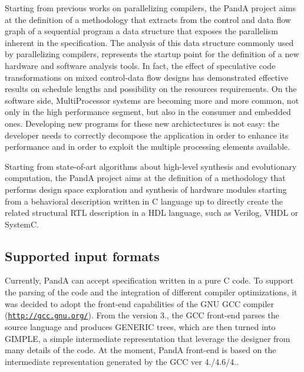 \begin{DoxyItemize}
\item Starting from previous works on parallelizing compilers, the PandA project aims at the definition of a methodology that extracts from the control and data flow graph of a sequential program a data structure that exposes the parallelism inherent in the specification. The analysis of this data structure commonly used by parallelizing compilers, represents the startup point for the definition of a new hardware and software analysis tools. In fact, the effect of speculative code transformations on mixed control-\/data flow designs has demonstrated effective results on schedule lengths and possibility on the resources requirements. On the software side, {\ttfamily Multi\+Processor} systems are becoming more and more common, not only in the high performance segment, but also in the consumer and embedded ones. Developing new programs for these new archictectures is not easy\+: the developer needs to correctly decompose the application in order to enhance its performance and in order to exploit the multiple processing elements available.
\item Starting from state-\/of-\/art algorithms about high-\/level synthesis and evolutionary computation, the PandA project aims at the definition of a methodology that performs design space exploration and synthesis of hardware modules starting from a behavioral description written in C language up to directly create the related structural R\+TL description in a H\+DL language, such as Verilog, V\+H\+DL or SystemC.
\end{DoxyItemize}\hypertarget{PandA_DOC_input_formats}{}\subsection{Supported input formats}\label{PandA_DOC_input_formats}
Currently, PandA can accept specification written in a pure C code. To support the parsing of the code and the integration of different compiler optimizations, it was decided to adopt the front-\/end capabilities of the G\+NU G\+CC compiler (\href{http://gcc.gnu.org/}{\tt http\+://gcc.\+gnu.\+org/}). From the version 3., the G\+CC front-\/end parses the source language and produces G\+E\+N\+E\+R\+IC trees, which are then turned into G\+I\+M\+P\+LE, a simple intermediate representation that leverage the designer from many details of the code. At the moment, PandA front-\/end is based on the intermediate representation generated by the G\+CC ver 4./4.6/4..


